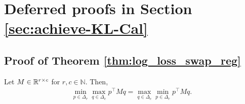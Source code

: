 \section{Deferred proofs in Section \ref{sec:achieve-KL-Cal}}\label{app:proof_existence_swap_log_loss}

\subsection{Proof of Theorem \ref{thm:log_loss_swap_reg}}
\begin{theorem}\label{thm:von_neumann}
    Let $M \in {\mathbb{R}}^{r \times c}$ for  $r, c \in \mathbb{N}$. Then, \begin{align*}
        \min_{p \in \Delta_{r}} \max_{q \in \Delta_{c}} p^{\intercal} M q = \max_{q \in \Delta_{c}} \min_{p \in \Delta_{r}} p^{\intercal} M q.
    \end{align*}
\end{theorem}

